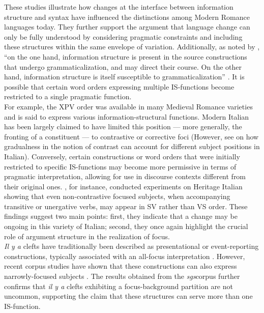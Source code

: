 These studies illustrate how changes at the interface between information structure and syntax have influenced the distinctions among Modern Romance languages today. They further support the argument that language change can only be fully understood by considering pragmatic constraints and including these structures within the same envelope of variation.
Additionally, as noted by \textcite{lehmann2008grammaticalization}, ``on the one hand, information structure is present in the source constructions that undergo grammaticalization, and may direct their course. On the other hand, information structure is itself susceptible to grammaticalization” \parencite[1]{lehmann2008grammaticalization}. It is possible that certain word orders expressing multiple IS-functions become restricted to a single pragmatic function.\\
For example, the XPV order was available in many Medieval Romance varieties and is said to express various information-structural functions. Modern Italian has been largely claimed to have limited this position — more generally, the fronting of a constituent — to contrastive or corrective foci (However, see \cite{cruschina2021} on how gradualness in the notion of contrast can account for different subject positions in Italian). Conversely, certain constructions or word orders that were initially restricted to specific IS-functions may become more permissive in terms of pragmatic interpretation, allowing for use in discourse contexts different from their original ones. \textcite{caloi2018answering}, for instance, conducted experiments on Heritage Italian showing that even non-contrastive focused subjects, when accompanying transitive or unergative verbs, may appear in SV rather than VS order. These findings suggest two main points: first, they indicate that a change may be ongoing in this variety of Italian; second, they once again highlight the crucial role of argument structure in the realization of focus. \\
\textit{Il y a} clefts have traditionally been described as presentational or event-reporting constructions, typically associated with an all-focus interpretation \parencite{lambrecht1996information}. However, recent corpus studies have shown that these constructions can also express narrowly-focused subjects \parencite{karssenberg2017oiseaux, Karssenberg2018}. The results obtained from the \textit{sgs}corpus further confirms that \textit{il y a} clefts exhibiting a focus-background partition are not uncommon, supporting the claim that these structures can serve more than one IS-function.

